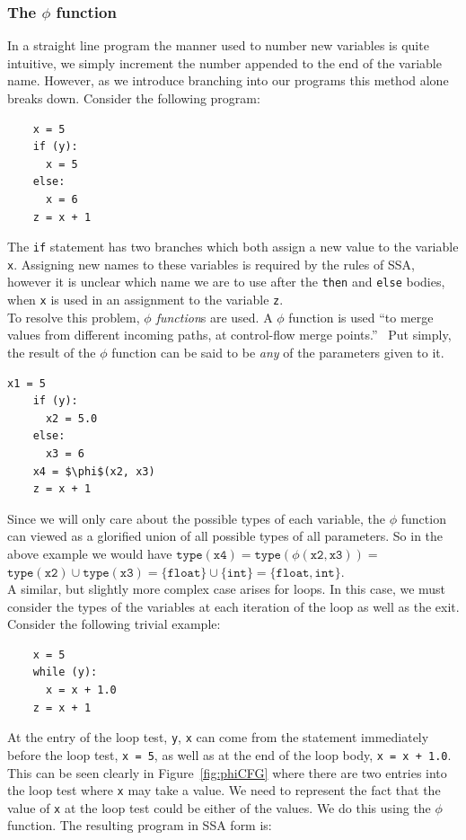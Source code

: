\documentclass[12pt, titlepage]{article}
\begin{document}
\subsubsection{The $\phi$ function}
In a straight line program the manner used to number new variables is quite intuitive, we simply increment the number appended to the end of the variable name. However, as we introduce branching into our programs this method alone breaks down. Consider the following program:
\begin{lstlisting}
    x = 5
    if (y):
      x = 5
    else:
      x = 6
    z = x + 1
\end{lstlisting}
The \texttt{if} statement has two branches which both assign a new value to the variable \texttt{x}. Assigning new names to these variables is required by the rules of SSA, however it is unclear which name we are to use after the \texttt{then} and \texttt{else} bodies, when \texttt{x} is used in an assignment to the variable \texttt{z}. \\
\indent To resolve this problem, \emph{$\phi$ function}s are used. A $\phi$ function is used ``to merge values from different incoming paths, at control-flow merge points.''~\cite{ssaBook} Put simply, the result of the $\phi$ function can be said to be \emph{any} of the parameters given to it. 
\begin{lstlisting}[mathescape]
    x1 = 5
    if (y):
      x2 = 5.0
    else:
      x3 = 6
    x4 = $\phi$(x2, x3)
    z = x + 1
\end{lstlisting}
Since we will only care about the possible types of each variable, the $\phi$ function can viewed as a glorified union of all possible types of all parameters. So in the above example we would have $\mathtt{type(x4) = type(\phi(x2, x3)) =}$ \\ $\mathtt{type(x2) \cup type(x3) = \{float\} \cup \{int\} = \{float, int\}}$. \\
\indent A similar, but slightly more complex case arises for loops. In this case, we must consider the types of the variables at each iteration of the loop as well as the exit. Consider the following trivial example:
\begin{lstlisting}
    x = 5
    while (y):
      x = x + 1.0
    z = x + 1
\end{lstlisting}
At the entry of the loop test, \texttt{y}, \texttt{x} can come from the statement immediately before the loop test, \texttt{x = 5}, as well as at the end of the loop body, \texttt{x = x + 1.0}. This can be seen clearly in Figure~\ref{fig:phiCFG} where there are two entries into the loop test where \texttt{x} may take a value. We need to represent the fact that the value of \texttt{x} at the loop test could be either of the values. We do this using the $\phi$ function. The resulting program in SSA form is:
\end{document}
